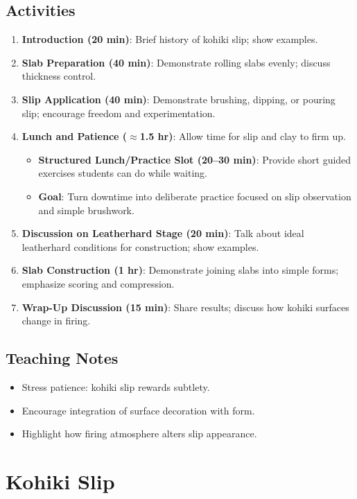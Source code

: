 \documentclass[12pt]{scrartcl}
\begin{document}
\subsection*{Activities}
\begin{enumerate}
  \item \textbf{Introduction (20 min)}: Brief history of kohiki slip; show examples.
  \item \textbf{Slab Preparation (40 min)}: Demonstrate rolling slabs evenly; discuss thickness control.
  \item \textbf{Slip Application (40 min)}: Demonstrate brushing, dipping, or pouring slip; encourage freedom and experimentation.
  \item \textbf{Lunch and Patience ($\approx$1.5 hr)}: Allow time for slip and clay to firm up.
  \begin{itemize}
    \item \textbf{Structured Lunch/Practice Slot (20–30 min)}: Provide short guided exercises students can do while waiting.
    \item \textbf{Goal}: Turn downtime into deliberate practice focused on slip observation and simple brushwork.
  \end{itemize}
  \item \textbf{Discussion on Leatherhard Stage (20 min)}: Talk about ideal leatherhard conditions for construction; show examples.
  \item \textbf{Slab Construction (1 hr)}: Demonstrate joining slabs into simple forms; emphasize scoring and compression.
  \item \textbf{Wrap-Up Discussion (15 min)}: Share results; discuss how kohiki surfaces change in firing.
\end{enumerate}

\subsection*{Teaching Notes}
\begin{itemize}
  \item Stress patience: kohiki slip rewards subtlety.
  \item Encourage integration of surface decoration with form.
  \item Highlight how firing atmosphere alters slip appearance.
\end{itemize}

\section*{Kohiki Slip}
\end{document}
